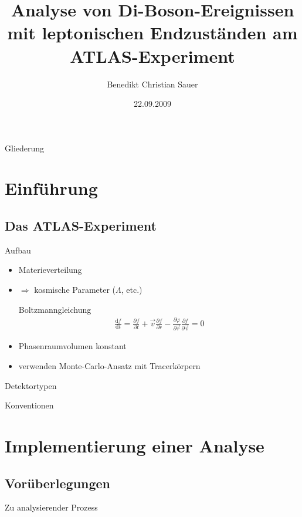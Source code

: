 \documentclass{beamer}
\title[Analyse von Di-Boson-Ereignissen]{Analyse von Di-Boson-Ereignissen mit
leptonischen Endzuständen am ATLAS-Experiment
}
\author[B. Sauer]{Benedikt Christian Sauer}
\institute{Physikalisches Institut der Universität Bonn}
\date{22.09.2009}
\begin{document}
\begin{frame}
  \titlepage
\end{frame}

\begin{frame}{Gliederung}
  \tableofcontents[pausesections]
\end{frame}

\section{Einführung}
\subsection{Das ATLAS-Experiment}
\begin{frame}{Aufbau}
  \begin{itemize}
    \item Materieverteilung
    \item $\Rightarrow$ kosmische Parameter ($\Lambda$, etc.)
      \pause
      \vskip10pt
    \begin{block}{Boltzmanngleichung}
      \begin{align}
        \frac{\mathrm df}{\mathrm dt} = \frac{\partial f}{\partial t} + \vec v
        \frac{\partial f}{\partial r} - \frac{\partial \varphi}{\partial \vec
        r}\frac{\partial f}{\partial \vec v} = 0
      \end{align}
    \end{block}
      \pause
    \item Phasenraumvolumen konstant
      \pause
    \item verwenden Monte-Carlo-Ansatz mit Tracerkörpern
  \end{itemize}
\end{frame}

\begin{frame}{Detektortypen}
\end{frame}

\begin{frame}{Konventionen}
\end{frame}

\section{Implementierung einer Analyse}
\subsection{Vorüberlegungen}
\begin{frame}{Zu analysierender Prozess}
\end{frame}
\end{document}
